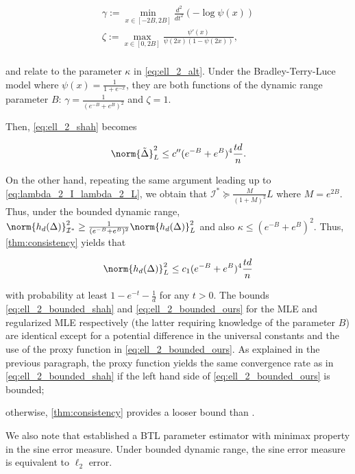 \begin{equation}\label{eq:gamma.zeta}
\begin{array}{c}
    \gamma :=  \min_{x \in [-2B,2B]} \frac{d^2}{dt^2}(-\log\psi(x)) \\
    \zeta := \max_{x \in [0,2B]} \frac{\psi'(x)}{\psi(2x)(1-\psi(2x))}, \\
\end{array}
\end{equation}

and relate to the parameter $\kappa$ in \ref{eq:ell_2_alt}. Under the Bradley-Terry-Luce model where $\psi(x) = \frac{1}{1+e^{-x}}$, they are both functions of the dynamic range parameter $B$: $\gamma = \frac{1}{(e^{-B}+e^B)^2}$ and $\zeta = 1$.

Then, \ref{eq:ell_2_shah} becomes

\begin{equation} \label{eq:ell_2_bounded_shah}
    \norm{\tilde{\Delta}}_L^2 \leq c'' {(e^{-B}+e^B)^4}\frac{td}{n}.
\end{equation}

On the other hand, repeating the same argument leading up to \ref{eq:lambda_2_I_lambda_2_L}, we obtain that $\mathcal{I}^* \succeq \frac{M}{(1+M)^2} L$ where $M = e^{2B}$. Thus, under the bounded dynamic range, $
    \norm{h_d(\Delta)}_{\mathcal{I}^*}^2 \geq \frac{1}{(e^{-B}+e^B)^2} \norm{h_d(\Delta)}_{L}^2
$
and also $\kappa \leq (e^{-B}+e^B)^2$. Thus,  \ref{thm:consistency} yields that

\begin{equation} \label{eq:ell_2_bounded_ours}
    \norm{h_d(\Delta)}_L^2 \leq c_1 {(e^{-B}+e^B)^4}\frac{td}{n}
\end{equation}

with probability at least $1 - e^{-t} - \frac{1}{d}$ for any $t > 0$. The bounds \eqref{eq:ell_2_bounded_shah} and  \eqref{eq:ell_2_bounded_ours} for the MLE and regularized MLE respectively (the latter requiring knowledge of the parameter $B$)  are identical except for a potential difference in the universal constants and the use of the proxy function in \ref{eq:ell_2_bounded_ours}. As explained in the previous paragraph, the proxy function yields the same convergence rate as in \ref{eq:ell_2_bounded_shah} if the left hand side of \ref{eq:ell_2_bounded_ours} is bounded; 

otherwise, \ref{thm:consistency} provides a looser bound than \citet{shah2016estimation}. 

We also note that \citet{hendrickx2019graph} established a BTL parameter estimator with minimax property in the sine error measure. Under bounded dynamic range, the sine error measure is equivalent to $\ell_2$ error.


